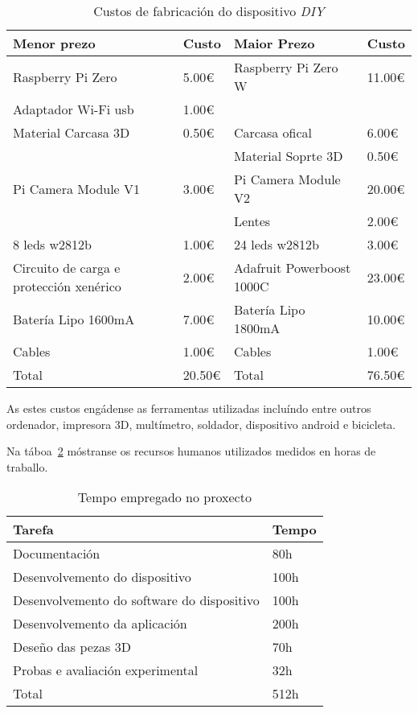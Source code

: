 \begin{table}[tb]
    \label{tab:custos_dispositivo}
    \caption{Custos de fabricación do dispositivo \emph{DIY}}
    \begin{center}
        \begin{tabular}{|l|l||l|l|}
            \hline
             Menor prezo & Custo  & Maior Prezo & Custo \\ \hline
             Raspberry Pi Zero & 5.00€  & Raspberry Pi Zero W& 11.00€ \\ \hline
             Adaptador Wi-Fi usb & 1.00€ &  & \\ \hline
             Material Carcasa 3D & 0.50€ & Carcasa ofical & 6.00€ \\ \hline
              &  & Material Soprte 3D & 0.50€ \\ \hline
             Pi Camera Module V1 & 3.00€ & Pi Camera Module V2 & 20.00€ \\ \hline
              &  & Lentes  & 2.00€ \\ \hline
             8 leds w2812b & 1.00€  &  24 leds w2812b & 3.00€\\ \hline
             Circuito de carga e protección xenérico & 2.00€  & Adafruit Powerboost 1000C & 23.00€ \\ \hline
             Batería Lipo 1600mA & 7.00€ & Batería Lipo 1800mA & 10.00€\\ \hline
             Cables & 1.00€ &  Cables & 1.00€ \\ \hline
             Total & 20.50€ &  Total & 76.50€ \\ \hline
        \end{tabular}
    \end{center}
\end{table}

As estes custos engádense as ferramentas utilizadas incluíndo entre outros ordenador, impresora 3D, multímetro, soldador, dispositivo android e bicicleta.

Na táboa~\ref{tab:custos_humanos} móstranse os recursos humanos utilizados medidos en horas de traballo.

\begin{table}[tb]
    \label{tab:custos_humanos}
    \caption{Tempo empregado no proxecto}
    \begin{center}
        \begin{tabular}{|l|l|}
            \hline
             Tarefa & Tempo\\ \hline
             Documentación & 80h \\ \hline
             Desenvolvemento do dispositivo & 100h \\ \hline
             Desenvolvemento do software do dispositivo & 100h \\ \hline
             Desenvolvemento da aplicación & 200h \\ \hline
             Deseño das pezas 3D & 70h \\ \hline
             Probas e avaliación experimental & 32h\\ \hline
             Total & 512h \\ \hline
        \end{tabular}
    \end{center}
\end{table}
